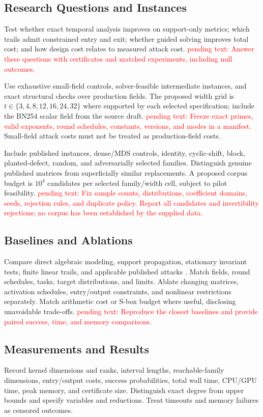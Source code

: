 \documentclass[conference]{IEEEtran}
\theoremstyle{definition}
\theoremstyle{plain}
\begin{document}
\subsection{Research Questions and Instances}
Test whether exact temporal analysis improves on support-only metrics;
which trails admit constrained entry and exit; whether guided solving
improves total cost; and how design cost relates to measured attack cost.
\textcolor{red}{pending text: Answer these questions with certificates
and matched experiments, including null outcomes.}

Use exhaustive small-field controls, solver-feasible intermediate
instances, and exact structural checks over production fields.
The proposed width grid is $t\in\{3,4,8,12,16,24,32\}$ where supported
by each selected specification; include the BN254 scalar field from
the source draft.
\textcolor{red}{pending text: Freeze exact primes, valid exponents,
round schedules, constants, versions, and modes in a manifest.}
Small-field attack costs must not be treated as production-field costs.

Include published instances, dense/MDS controls, identity, cyclic-shift,
block, planted-defect, random, and adversarially selected families.
Distinguish genuine published matrices from superficially similar replacements.
A proposed corpus budget is $10^4$ candidates per selected family/width
cell, subject to pilot feasibility.
\textcolor{red}{pending text: Fix sample counts, distributions, coefficient
domains, seeds, rejection rules, and duplicate policy. Report all candidates
and invertibility rejections; no corpus has been established by the supplied data.}

\subsection{Baselines and Ablations}
Compare direct algebraic modeling, support propagation, stationary
invariant tests, finite linear trails, and applicable published attacks
\cite{poseidonneptune2025,cryptoeprint:2026/306,slipway2026,nonlinear2026}.
Match fields, round schedules, tasks, target distributions, and limits.
Ablate changing matrices, activation schedules, entry/output constraints,
and nonlinear restrictions separately. Match arithmetic cost or S-box
budget where useful, disclosing unavoidable trade-offs.
\textcolor{red}{pending text: Reproduce the closest baselines and provide
paired success, time, and memory comparisons.}

\subsection{Measurements and Results}
Record kernel dimensions and ranks, interval lengths, reachable-family
dimensions, entry/output costs, success probabilities, total wall time,
CPU/GPU time, peak memory, and certificate size. Distinguish exact degree
from upper bounds and specify variables and reductions.
Treat timeouts and memory failures as censored outcomes.
\end{document}
